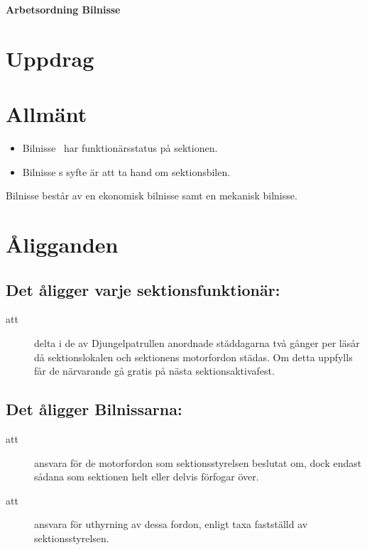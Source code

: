 \renewcommand{\dateseparator}{-} %

\renewcommand{\forening}{Bilnisse }

\begin{center}
\LARGE{\textbf{Arbetsordning Bilnisse}}
\end{center}

\section{Uppdrag}


\section{Allmänt}
\begin{itemize}
\item \forening \ har funktionärsstatus på sektionen.
\item \forening s syfte är att ta hand om sektionsbilen.
\end{itemize}


\forening  består av en ekonomisk bilnisse samt en mekanisk bilnisse.


\section{Åligganden}
\subsection{Det åligger varje sektionsfunktionär:}
    \begin{description}
      \item[att] delta i de av Djungelpatrullen anordnade städdagarna två gånger per
      läsår då sektionslokalen och sektionens motorfordon städas. Om detta uppfylls får de närvarande gå gratis på nästa
      sektionsaktivafest.
    \end{description}

\subsection{Det åligger Bilnissarna:}
    \begin{description}
      \item[att] ansvara för de motorfordon som sektionsstyrelsen
      beslutat om, dock endast sådana som sektionen helt eller delvis
      förfogar över.
      \item[att] ansvara för uthyrning av dessa fordon, enligt taxa
      fastställd av sektionsstyrelsen.
    \end{description}
